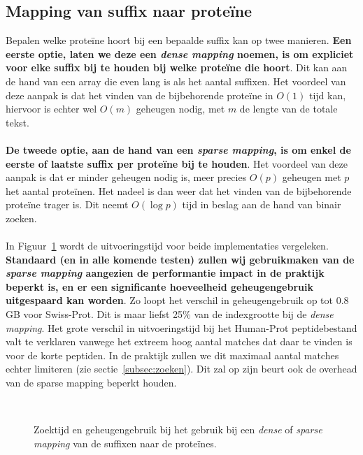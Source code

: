 \subsection{Mapping van suffix naar proteïne}\label{subsec:mapping-van-suffix-naar-proteine}
Bepalen welke proteïne hoort bij een bepaalde suffix kan op twee manieren.
\textbf{Een eerste optie, laten we deze een \textit{dense mapping} noemen, is om expliciet voor elke suffix bij te houden bij welke proteïne die hoort}.
Dit kan aan de hand van een array die even lang is als het aantal suffixen.
Het voordeel van deze aanpak is dat het vinden van de bijbehorende proteïne in $O(1)$ tijd kan, hiervoor is echter wel $O(m)$ geheugen nodig, met $m$ de lengte van de totale tekst.
\\ \\
\textbf{De tweede optie, aan de hand van een \textit{sparse mapping}, is om enkel de eerste of laatste suffix per proteïne bij te houden}.
Het voordeel van deze aanpak is dat er minder geheugen nodig is, meer precies $O(p)$ geheugen met $p$ het aantal proteïnen.
Het nadeel is dan weer dat het vinden van de bijbehorende proteïne trager is.
Dit neemt $O(\log p)$ tijd in beslag aan de hand van binair zoeken.
\\ \\
In Figuur~\ref{fig:dense_vs_sparse} wordt de uitvoeringstijd voor beide implementaties vergeleken.
\textbf{Standaard (en in alle komende testen) zullen wij gebruikmaken van de \textit{sparse mapping} aangezien de performantie impact in de praktijk beperkt is, en er een significante hoeveelheid geheugengebruik uitgespaard kan worden}.
Zo loopt het verschil in geheugengebruik op tot 0.8 GB voor Swiss-Prot.
Dit is maar liefst 25\% van de indexgrootte bij de \textit{dense mapping}.
Het grote verschil in uitvoeringstijd bij het Human-Prot peptidebestand valt te verklaren vanwege het extreem hoog aantal matches dat daar te vinden is voor de korte peptiden.
In de praktijk zullen we dit maximaal aantal matches echter limiteren (zie sectie~\ref{subsec:zoeken}).
Dit zal op zijn beurt ook de overhead van de sparse mapping beperkt houden.
\begin{figure}[H]
    \centering
    \\[4ex] %

    \caption{Zoektijd en geheugengebruik bij het gebruik bij een \textit{dense} of \textit{sparse mapping} van de suffixen naar de proteïnes.}\label{fig:dense_vs_sparse}
\end{figure}

